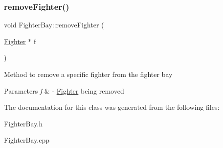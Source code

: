 \subsubsection{\texorpdfstring{remove\+Fighter()}{removeFighter()}}
{\footnotesize\ttfamily void Fighter\+Bay\+::remove\+Fighter (\begin{DoxyParamCaption}\item[{\hyperlink{classFighter}{Fighter} $\ast$}]{f }\end{DoxyParamCaption})}

Method to remove a specific fighter from the fighter bay 
\begin{DoxyParams}{Parameters}
{\em f} & -\/ \hyperlink{classFighter}{Fighter} being removed \\
\hline
\end{DoxyParams}


The documentation for this class was generated from the following files\+:\begin{DoxyCompactItemize}
\item 
Fighter\+Bay.\+h\item 
Fighter\+Bay.\+cpp\end{DoxyCompactItemize}

